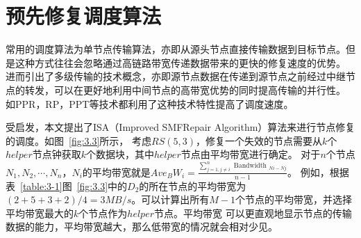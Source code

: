 


\section{预先修复调度算法}
常用的调度算法为单节点传输算法，亦即从源头节点直接传输数据到目标节点。但是这种方式往往会忽略通过高链路带宽传递数据带来的更快的修复速度的优势。
进而引出了多级传输的技术概念，亦即源节点数据在传递到源节点之前经过中继节点的转发，可以在更好地利用中间节点的高带宽优势的同时提高传输的并行性。
如PPR\cite{mitra2016partial}，RP\cite{li2017repair}，PPT\cite{bai2019fast}等技术都利用了这种技术特性提高了调度速度。

受\citet{zhou2022bandwidth}启发，本文提出了ISA（Improved SMFRepair Algorithm）算法来进行节点修复的调度。如图~\ref{fig:3.3}所示，
考虑$RS(5,3)$，修复一个失效的节点需要从$k$个$helper$节点钟获取$k$个数据块，其中$helper$节点由平均带宽进行确定。
对于$n$个节点${N_1,N_2,\cdots,N_n}$，$N_i$的平均带宽就是$Ave_BW_i=\frac{\sum_{j=1, j \neq i}^{n} \text { Bandwidth }{ }_{N i-N j}}{n-1}$。
例如，根据表~\ref{table:3-1}\cite{zhou2022bandwidth}图~\ref{fig:3.3}中的$D_2$的所在节点的平均带宽为
$(2+5+3+2)/4=3MB/s$。可以计算出所有$M-1$个节点的平均带宽，并选择平均带宽最大的$k$个节点作为$helper$节点。平均带宽
可以更直观地显示节点的传输数据的能力，平均带宽越大，那么低带宽的情况就会相对少见。

